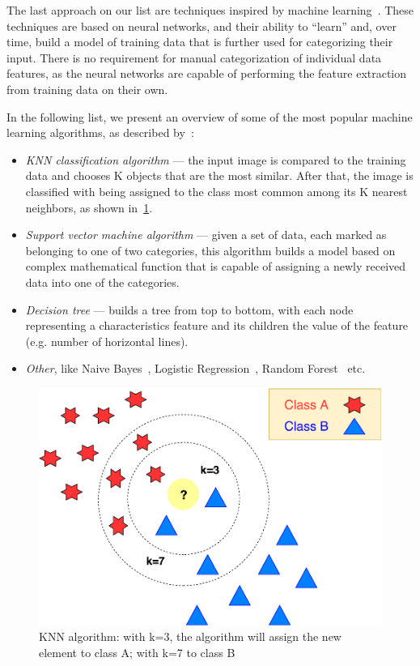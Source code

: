 The last approach on our list are techniques inspired by machine learning~\citep{sebastiani2002machine}. These techniques are based on neural networks, and their ability to ``learn'' and, over time, build a model of training data that is further used for categorizing their input. There is no requirement for manual categorization of individual data features, as the neural networks are capable of performing the feature extraction from training data on their own.

In the following list, we present an overview of some of the most popular machine learning algorithms, as described by~\citet{bhavsar2012comparative}:
\begin{itemize}
    \item \emph{KNN classification algorithm} --- the input image is compared to the training data and chooses K objects that are the most similar. After that, the image is classified with being assigned to the class most common among its K nearest neighbors, as shown in~\cref{fig:characterClassKNN}.
    \item \emph{Support vector machine algorithm} --- given a set of data, each marked as belonging to one of two categories, this algorithm builds a model based on complex mathematical function that is capable of assigning a newly received data into one of the categories.
    \item \emph{Decision tree} --- builds a tree from top to bottom, with each node representing a characteristics feature and its children the value of the feature (e.g. number of horizontal lines). 
    \item \emph{Other}, like Naive Bayes~\cite{ng2002discriminative}, Logistic Regression~\cite{ng2002discriminative}, Random Forest~\cite{segal2004machine} etc.
\end{itemize}

\begin{figure}[t]
\centering
\includegraphics[width=0.7\linewidth]{img/characterClassification/knn.pdf}
\caption{KNN algorithm: with k=3, the algorithm will assign the new element to class A; with k=7 to class B } \label{fig:characterClassKNN}
\end{figure}

